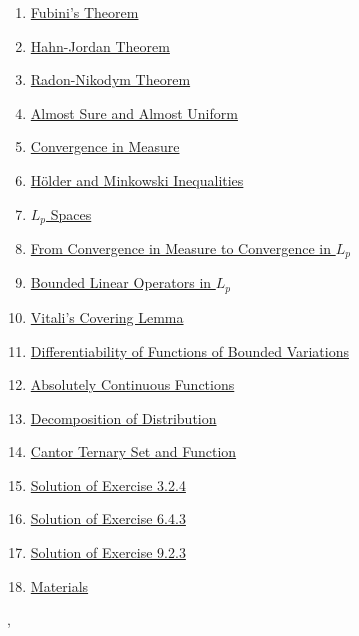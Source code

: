 \documentclass[11pt]{article}
\renewcommand{\today}{\shortmonthname[\the\month] \the \day,  \the\year}
\begin{document}
\begin{enumerate}
	\item  \href{https://mp.weixin.qq.com/s/DAo0mBE62ZF730olpQeh8g}{Fubini's Theorem} %
	\item  \href{https://mp.weixin.qq.com/s/6xm02qBrT3rDmzqWHF0wwQ}{Hahn-Jordan Theorem} %
	\item  \href{https://mp.weixin.qq.com/s/WDZUO3U6BK6fZDo7LbV1ZQ}{Radon-Nikodym Theorem} %
	\item  \href{https://mp.weixin.qq.com/s/_nYqpYjkPS7JcAt1lEzClA}{Almost Sure and Almost Uniform} %
	\item  \href{https://mp.weixin.qq.com/s/mi9OeiX0uJmMEwjwKeQqVQ}{Convergence in Measure} %
	\item  \href{https://mp.weixin.qq.com/s/ZfKhXHtWZoiL1j0uDkUl6w}{H\"{o}lder and Minkowski Inequalities} %
	\item  \href{https://mp.weixin.qq.com/s/-YJV1gju1rsRfSoNxADPhw}{$L_p$ Spaces} %
	\item  \href{https://mp.weixin.qq.com/s/mVnVGlhGycI7TwAdOP9ZrQ}{From Convergence in Measure to Convergence in $L_p$} %
	\item  \href{https://mp.weixin.qq.com/s/el73p71y1iyJrO21sH-93A}{Bounded Linear Operators in $L_p$} %
	\item  \href{https://mp.weixin.qq.com/s/1SGchrtxb5vqWsBwIZG9qg}{Vitali's Covering Lemma} %
	\item  \href{https://mp.weixin.qq.com/s/C3u6hOXztRW6H1G1Qbfo0A}{Differentiability of Functions of Bounded Variations} %
	\item  \href{https://mp.weixin.qq.com/s/C8X7Hzabt85GvUVmUiNrXw}{Absolutely Continuous Functions} %
	\item  \href{https://mp.weixin.qq.com/s/i-yfNxsRGo5Au_VekLP3gw}{Decomposition of Distribution} %
	\item  \href{https://mp.weixin.qq.com/s/mq_Ucmbzbzn3MCwy1VzZcA}{Cantor Ternary Set and Function} %
	\item  \href{https://mp.weixin.qq.com/s/oRZiIhv235No3jAe9v6GQg}{Solution of Exercise 3.2.4} %
	\item  \href{https://mp.weixin.qq.com/s/XUCSW9yjp1ZFqgDH_5LGIg}{Solution of Exercise 6.4.3} %
	\item  \href{https://mp.weixin.qq.com/s/EPgji_A99cpxx0npUA2uMw}{Solution of Exercise 9.2.3} %
	\item  \href{https://pan.baidu.com/s/1lgHzfcNeB9gLVjRz4OARgQ?pwd=1121}{Materials}
\end{enumerate}


%
\begin{flushright}
	\tiny \today 
\end{flushright}
\end{document}
